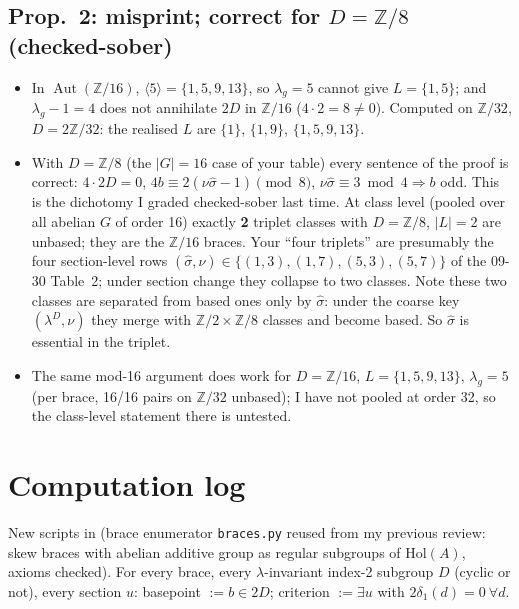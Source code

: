 \documentclass[11pt]{article}
\newcommand{\Z}{\mathbb{Z}}
\newcommand{\Aut}{\operatorname{Aut}}
\newcommand{\sh}{\hat\sigma}
\begin{document}
\subsection*{Prop.~2: \textbf{misprint}; correct for $D=\Z/8$ (checked-sober)}
\begin{itemize}[leftmargin=*]
\item In $\Aut(\Z/16)$, $\langle5\rangle=\{1,5,9,13\}$, so $\lambda_g=5$ cannot give
$L=\{1,5\}$; and $\lambda_g-1=4$ does not annihilate $2D$ in $\Z/16$ ($4\cdot2=8\neq0$).
Computed on $\Z/32$, $D=2\Z/32$: the realised $L$ are $\{1\}$, $\{1,9\}$, $\{1,5,9,13\}$.
\item With $D=\Z/8$ (the $|G|=16$ case of your table) every sentence of the proof is correct:
$4\cdot2D=0$, $4b\equiv2(\nu\sh-1)\pmod 8$, $\nu\sh\equiv3\bmod4\Rightarrow b$ odd. This is
the dichotomy I graded checked-sober last time. At class level (pooled over all abelian $G$
of order 16) exactly \textbf{2} triplet classes with $D=\Z/8$, $|L|=2$ are unbased; they are
the $\Z/16$ braces. Your ``four triplets'' are presumably the four section-level rows
$(\sh,\nu)\in\{(1,3),(1,7),(5,3),(5,7)\}$ of the 09-30 Table~2; under section change they
collapse to two classes. Note these two classes are separated from based ones only by
$\sh$: under the coarse key $(\lambda^D,\nu)$ they merge with $\Z/2\times\Z/8$ classes and
become based. So $\sh$ is essential in the triplet.
\item The same mod-16 argument does work for $D=\Z/16$, $L=\{1,5,9,13\}$, $\lambda_g=5$
(per brace, 16/16 pairs on $\Z/32$ unbased); I have not pooled at order 32, so the class-level
statement there is untested.
\end{itemize}

\section{Computation log}
New scripts in
(brace enumerator \texttt{braces.py} reused from my previous review: skew braces with abelian
additive group as regular subgroups of $\mathrm{Hol}(A)$, axioms checked). For every brace,
every $\lambda$-invariant index-2 subgroup $D$ (cyclic or not), every section $u$:
basepoint $:=b\in2D$; criterion $:=\exists u$ with $2\delta_1(d)=0\ \forall d$.
\end{document}
